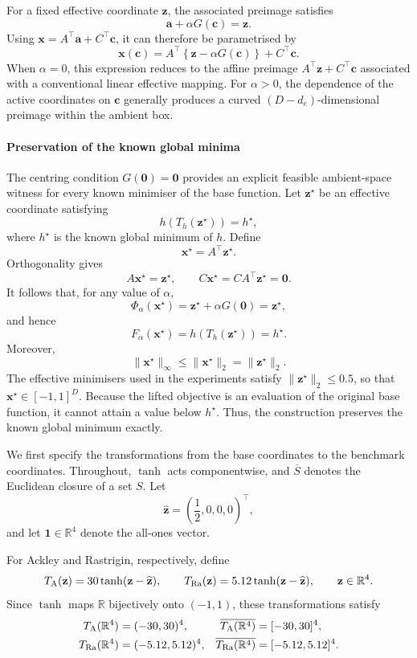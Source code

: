 \documentclass[pdflatex,sn-mathphys-num]{sn-jnl}%
\theoremstyle{thmstyleone}%
\theoremstyle{thmstyletwo}%
\theoremstyle{thmstylethree}%
\begin{document}
\begin{appendices}
For a fixed effective coordinate $\mathbf{z}$, the associated preimage satisfies
\[
\mathbf{a}+\alpha G(\mathbf{c})=\mathbf{z}.
\]
Using $\mathbf{x}=A^\top\mathbf{a}+C^\top\mathbf{c}$, it can therefore be parametrised by
\[
\mathbf{x}(\mathbf{c})
=
A^\top\!\left\{\mathbf{z}-\alpha G(\mathbf{c})\right\}
+
C^\top\mathbf{c}.
\]
When $\alpha=0$, this expression reduces to the affine preimage $A^\top\mathbf{z}+C^\top\mathbf{c}$ associated with a conventional linear effective mapping. For $\alpha>0$, the dependence of the active coordinates on $\mathbf{c}$ generally produces a curved $(D-d_e)$-dimensional preimage within the ambient box.

\paragraph{Preservation of the known global minima}

The centring condition $G(\mathbf{0})=\mathbf{0}$ provides an explicit feasible ambient-space witness for every known minimiser of the base function. Let $\mathbf{z}^{\star}$ be an effective coordinate satisfying
\[
h\!\left(T_h(\mathbf{z}^{\star})\right)=h^\star,
\]
where $h^\star$ is the known global minimum of $h$. Define
\[
\mathbf{x}^{\star}=A^\top\mathbf{z}^{\star}.
\]
Orthogonality gives
\[
A\mathbf{x}^{\star}=\mathbf{z}^{\star},
\qquad
C\mathbf{x}^{\star}
=
CA^\top\mathbf{z}^{\star}
=
\mathbf{0}.
\]
It follows that, for any value of $\alpha$,
\[
\Phi_{\alpha}(\mathbf{x}^{\star})
=
\mathbf{z}^{\star}+\alpha G(\mathbf{0})
=
\mathbf{z}^{\star},
\]
and hence
\[
F_{\alpha}(\mathbf{x}^{\star})
=
h\!\left(T_h(\mathbf{z}^{\star})\right)
=
h^\star.
\]
Moreover,
\[
\|\mathbf{x}^{\star}\|_{\infty}
\leq
\|\mathbf{x}^{\star}\|_2
=
\|\mathbf{z}^{\star}\|_2.
\]
The effective minimisers used in the experiments satisfy $\|\mathbf{z}^{\star}\|_2\leq 0.5$, so that $\mathbf{x}^{\star}\in[-1,1]^D$. Because the lifted objective is an evaluation of the original base function, it cannot attain a value below $h^\star$. Thus, the construction preserves the known global minimum exactly.


We first specify the transformations from the base coordinates to the benchmark coordinates. Throughout, $\tanh$ acts componentwise, and $\overline{S}$ denotes the Euclidean closure of a set $S$. Let
\[
  \widehat{\mathbf z}
  =\left(\frac12,0,0,0\right)^\top,
\]
and let $\mathbf 1\in\mathbb R^4$ denote the all-ones vector.

For Ackley and Rastrigin, respectively, define
\[
  T_{\rm A}(\mathbf z)
  =30\tanh(\mathbf z-\widehat{\mathbf z}),
  \qquad
  T_{\rm Ra}(\mathbf z)
  =5.12\tanh(\mathbf z-\widehat{\mathbf z}),
  \qquad \mathbf z\in\mathbb R^4.
\]
Since $\tanh$ maps $\mathbb R$ bijectively onto $(-1,1)$, these transformations satisfy
\[
\begin{aligned}
  T_{\rm A}(\mathbb R^4)&=(-30,30)^4,
  &
  \overline{T_{\rm A}(\mathbb R^4)}&=[-30,30]^4,\\
  T_{\rm Ra}(\mathbb R^4)&=(-5.12,5.12)^4,
  &
  \overline{T_{\rm Ra}(\mathbb R^4)}&=[-5.12,5.12]^4.
\end{aligned}
\]


\end{appendices}
\end{document}
